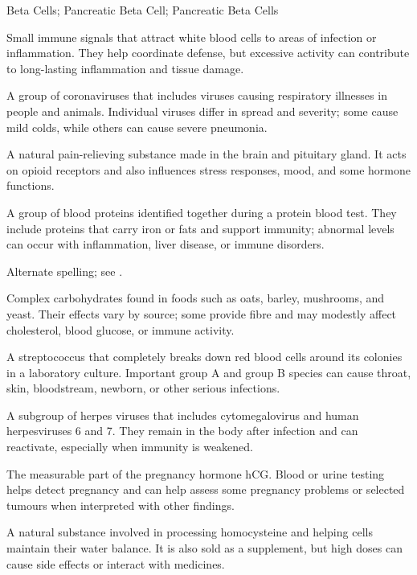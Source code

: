 \synonyms
Beta Cells; Pancreatic Beta Cell; Pancreatic Beta Cells

 Small immune signals that attract white blood cells to areas of infection or inflammation. They help coordinate defense, but excessive activity can contribute to long-lasting inflammation and tissue damage.

 A group of coronaviruses that includes viruses causing respiratory illnesses in people and animals. Individual viruses differ in spread and severity; some cause mild colds, while others can cause severe pneumonia.

 A natural pain-relieving substance made in the brain and pituitary gland. It acts on opioid receptors and also influences stress responses, mood, and some hormone functions.

 A group of blood proteins identified together during a protein blood test. They include proteins that carry iron or fats and support immunity; abnormal levels can occur with inflammation, liver disease, or immune disorders.

 Alternate spelling; see .

 Complex carbohydrates found in foods such as oats, barley, mushrooms, and yeast. Their effects vary by source; some provide fibre and may modestly affect cholesterol, blood glucose, or immune activity.

 A streptococcus that completely breaks down red blood cells around its colonies in a laboratory culture. Important group A and group B species can cause throat, skin, bloodstream, newborn, or other serious infections.

 A subgroup of herpes viruses that includes cytomegalovirus and human herpesviruses 6 and 7. They remain in the body after infection and can reactivate, especially when immunity is weakened.

 The measurable part of the pregnancy hormone hCG. Blood or urine testing helps detect pregnancy and can help assess some pregnancy problems or selected tumours when interpreted with other findings.

 A natural substance involved in processing homocysteine and helping cells maintain their water balance. It is also sold as a supplement, but high doses can cause side effects or interact with medicines.

